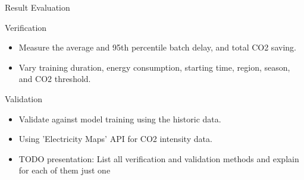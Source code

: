 \begin{frame}[t]{Result Evaluation}{}

  Verification
  \begin{itemize}
    \item Measure the average and 95th percentile batch delay, and
      total CO2 saving.
    \item Vary training duration, energy consumption, starting time,
      region, season, and CO2 threshold.
  \end{itemize}

  Validation
  \begin{itemize}
    \item Validate against model training using the historic data.
    \item Using 'Electricity Maps' API for CO2 intensity data.
  \end{itemize}

  \begin{itemize}
    \item TODO presentation: List all verification and validation
      methods and explain for each of them just one
  \end{itemize}

\end{frame}
